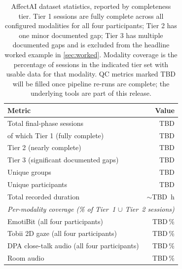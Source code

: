 
\begin{table}[t]
  \centering
  \caption{AffectAI dataset statistics, reported by completeness tier.
    Tier 1 sessions are fully complete across all configured modalities for
    all four participants; Tier 2 has one minor documented gap;
    Tier 3 has multiple documented gaps and is excluded from the headline
    worked example in \cref{sec:worked}.
    Modality coverage is the percentage of sessions in the indicated tier
    set with usable data for that modality.
    QC metrics marked TBD will be filled once pipeline re-runs are
    complete; the underlying tools are part of this release.}
  \label{tab:stats}
  \small
  \begin{tabular}{lr}
    \toprule
    \textbf{Metric} & \textbf{Value} \\
    \midrule
    Total final-phase sessions                          & TBD \\
    \quad of which Tier 1 (fully complete)              & TBD \\
    \quad Tier 2 (nearly complete)                      & TBD \\
    \quad Tier 3 (significant documented gaps)          & TBD \\
    Unique groups                                       & TBD \\
    Unique participants                                 & TBD \\
    Total recorded duration                             & $\sim$TBD~h \\
    \midrule
    \multicolumn{2}{l}{\textit{Per-modality coverage (\% of Tier~1 $\cup$ Tier~2 sessions)}} \\
    \midrule
    EmotiBit (all four participants)                    & TBD\,\% \\
    Tobii 2D gaze (all four participants)               & TBD\,\% \\
    DPA close-talk audio (all four participants)        & TBD\,\% \\
    Room audio                                          & TBD\,\% \\

\end{tabular}
\end{table}
